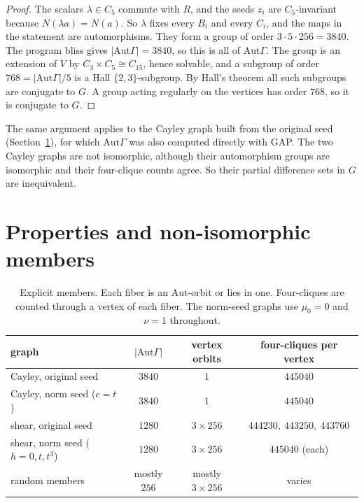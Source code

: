 \documentclass[11pt]{amsart}
\theoremstyle{definition}
\newcommand{\Aut}{\mathrm{Aut}}
\begin{document}
\begin{proof}
The scalars $\lambda\in C_5$ commute with $R$, and the seeds $z_i$ are $C_5$-invariant because $N(\lambda a)=N(a)$. So $\lambda$ fixes every $B_i$ and every $C_i$, and the maps in the statement are automorphisms. They form a group of order $3\cdot5\cdot256=3840$. The program bliss gives $|\Aut\Gamma|=3840$, so this is all of $\Aut\Gamma$. The group is an extension of $V$ by $C_3\times C_5\cong C_{15}$, hence solvable, and a subgroup of order $768=|\Aut\Gamma|/5$ is a Hall $\{2,3\}$-subgroup. By Hall's theorem all such subgroups are conjugate to $G$. A group acting regularly on the vertices has order $768$, so it is conjugate to $G$.
\end{proof}

The same argument applies to the Cayley graph built from the original seed (Section~\ref{sec:properties}), for which $\Aut\Gamma$ was also computed directly with GAP. The two Cayley graphs are not isomorphic, although their automorphism groups are isomorphic and their four-clique counts agree. So their partial difference sets in $G$ are inequivalent.

\section{Properties and non-isomorphic members}\label{sec:properties}

\begin{table}[ht]
\centering
\caption{Explicit members. Each fiber is an $\Aut$-orbit or lies in one. Four-cliques are counted through a vertex of each fiber. The norm-seed graphs use $\mu_0=0$ and $\nu=1$ throughout.}\label{tab:witnesses}
\begin{tabular}{lccc}
\toprule
graph & $|\Aut\Gamma|$ & vertex orbits & four-cliques per vertex\\
\midrule
Cayley, original seed & $3840$ & $1$ & $445040$\\
Cayley, norm seed ($c=t$) & $3840$ & $1$ & $445040$\\
shear, original seed & $1280$ & $3\times256$ & $444230,\ 443250,\ 443760$\\
shear, norm seed ($h=0,t,t^3$) & $1280$ & $3\times256$ & $445040$ (each)\\
random members & mostly $256$ & mostly $3\times256$ & varies\\
\bottomrule
\end{tabular}
\end{table}
\end{document}
